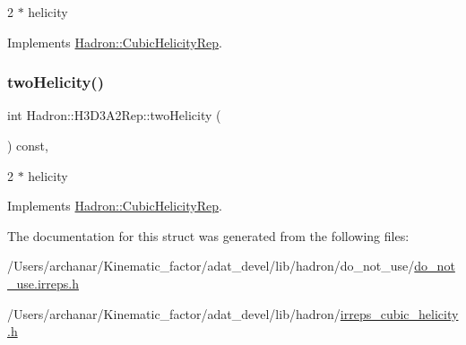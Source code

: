 2 $\ast$ helicity 

Implements \mbox{\hyperlink{structHadron_1_1CubicHelicityRep_af507aa56fc2747eacc8cb6c96db31ecc}{Hadron\+::\+Cubic\+Helicity\+Rep}}.

\mbox{\label{structHadron_1_1H3D3A2Rep_a9a02375c619de009aa21e02062e23dac}} 
\subsubsection{\texorpdfstring{twoHelicity()}{twoHelicity()}\hspace{0.1cm}{\footnotesize\ttfamily [2/2]}}
{\footnotesize\ttfamily int Hadron\+::\+H3\+D3\+A2\+Rep\+::two\+Helicity (\begin{DoxyParamCaption}{ }\end{DoxyParamCaption}) const\hspace{0.3cm}{\ttfamily [inline]}, {\ttfamily [virtual]}}

2 $\ast$ helicity 

Implements \mbox{\hyperlink{structHadron_1_1CubicHelicityRep_af507aa56fc2747eacc8cb6c96db31ecc}{Hadron\+::\+Cubic\+Helicity\+Rep}}.



The documentation for this struct was generated from the following files\+:\begin{DoxyCompactItemize}
\item 
/\+Users/archanar/\+Kinematic\+\_\+factor/adat\+\_\+devel/lib/hadron/do\+\_\+not\+\_\+use/\mbox{\hyperlink{do__not__use_8irreps_8h}{do\+\_\+not\+\_\+use.\+irreps.\+h}}\item 
/\+Users/archanar/\+Kinematic\+\_\+factor/adat\+\_\+devel/lib/hadron/\mbox{\hyperlink{lib_2hadron_2irreps__cubic__helicity_8h}{irreps\+\_\+cubic\+\_\+helicity.\+h}}\end{DoxyCompactItemize}
